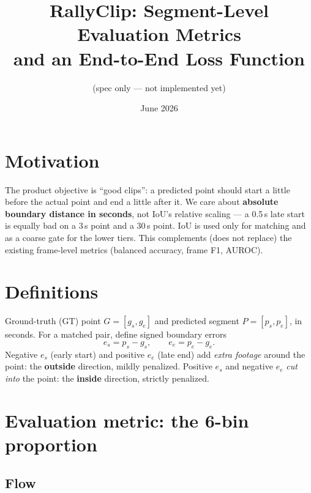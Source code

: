 \documentclass[11pt]{article}
\title{RallyClip: Segment-Level Evaluation Metrics \\ and an End-to-End Loss Function}
\author{(spec only --- not implemented yet)}
\date{June 2026}
\begin{document}
\maketitle

\section*{Motivation}

The product objective is ``good clips'': a predicted point should start a little before
the actual point and end a little after it. We care about \textbf{absolute boundary
distance in seconds}, not IoU's relative scaling --- a 0.5\,s late start is equally bad on
a 3\,s point and a 30\,s point. IoU is used only for matching and as a coarse gate for the
lower tiers. This complements (does not replace) the existing frame-level metrics
(balanced accuracy, frame F1, AUROC).

\section{Definitions}

Ground-truth (GT) point $G = [g_s, g_e]$ and predicted segment $P = [p_s, p_e]$, in seconds.
For a matched pair, define signed boundary errors
\[
e_s = p_s - g_s, \qquad e_e = p_e - g_e .
\]
Negative $e_s$ (early start) and positive $e_e$ (late end) add \emph{extra footage} around
the point: the \textbf{outside} direction, mildly penalized. Positive $e_s$ and negative
$e_e$ \emph{cut into} the point: the \textbf{inside} direction, strictly penalized.

\section{Evaluation metric: the 6-bin proportion}

\subsection{Flow}
\end{document}
